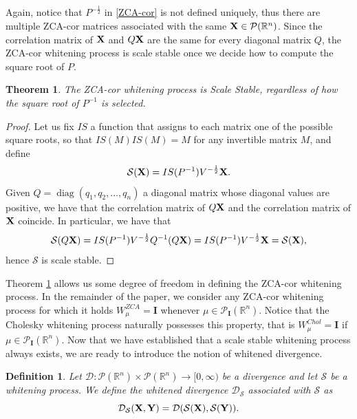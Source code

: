 \documentclass{article}
\renewcommand{\to}{\rightarrow}
\def\DDSS{\mathcal{D}_\mathcal{S}}
\def \Id{\mathbf{I}}
\def\bX{{\bf X}}
\def\bY{{\bf Y}}
\DeclareMathOperator{\diag}{diag}
\def \PP{\mathcal{P}}
\def \erre{\mathbb{R}}
\newtheorem{theorem}{Theorem}
\newtheorem{definition}{Definition}
\newtheorem{proof}{Proof}
\begin{document}
% 
% 

% 
Again, notice that $P^{-\frac{1}{2}}$ in \eqref{ZCA-cor} is not defined uniquely, thus there are multiple ZCA-cor matrices associated with the same $\bX\in\mathcal{P}(\erre^n)$.
% 
Since the correlation matrix of $\bX$ and $Q\bX$ are the same for every diagonal matrix $Q$, the ZCA-cor whitening process is scale stable once we decide how to compute the square root of $P$.
% 



\begin{theorem}
\label{thm:ZCAcorrSS}
    The ZCA-cor whitening process is {Scale Stable}, regardless of how the square root of $P^{-1}$ is selected.
\end{theorem}


\begin{proof}
    Let us fix $IS$ a function that assigns to each matrix one of the possible square roots, so that $IS(M)IS(M)=M$ for any invertible matrix $M$, and define
    \[
        \mathcal{S}(\bX)=IS(P^{-1})V^{-\frac{1}{2}}\bX.
    \]
    Given $Q=\diag(q_1,q_2,\dots,q_n)$ a diagonal matrix whose diagonal values are positive, we have that the correlation matrix of $Q\bX$ and the correlation matrix of $\bX$ coincide.
    In particular, we have that
    \[
        \mathcal{S}(Q\bX)=IS(P^{-1})V^{-\frac{1}{2}}Q^{-1}(Q\bX)=IS(P^{-1})V^{-\frac{1}{2}}\bX=\mathcal{S}(\bX),
    \]
    hence $\mathcal{S}$ is scale stable.
\end{proof}

% 
Theorem \ref{thm:ZCAcorrSS} allows us some degree of freedom in defining the ZCA-cor whitening process.
% 
In the remainder of the paper, we consider any ZCA-cor whitening process for which it holds $W^{ZCA}_\mu=\Id$ whenever $\mu\in\PP_{\Id}(\erre^n)$.
% 
Notice that the Cholesky whitening process naturally possesses this property, that is $W^{Chol}_\mu=\Id$ if $\mu\in\PP_{\Id}(\erre^n)$.
% 
Now that we have established that a scale stable whitening process always exists, we are ready to introduce the notion of whitened divergence.
% 

\begin{definition}
    Let $\mathcal{D}:\PP(\erre^n)\times\PP(\erre^n)\to[0,\infty)$ be a divergence and let $\mathcal{S}$ be a whitening process. 
    We define the whitened divergence $\DDSS$ associated with $\mathcal{S}$ as
    \[
    \DDSS(\bX,\bY)=\mathcal{D}(\mathcal{S}(\bX),\mathcal{S}(\bY)).
    \]
\end{definition}
\end{document}
